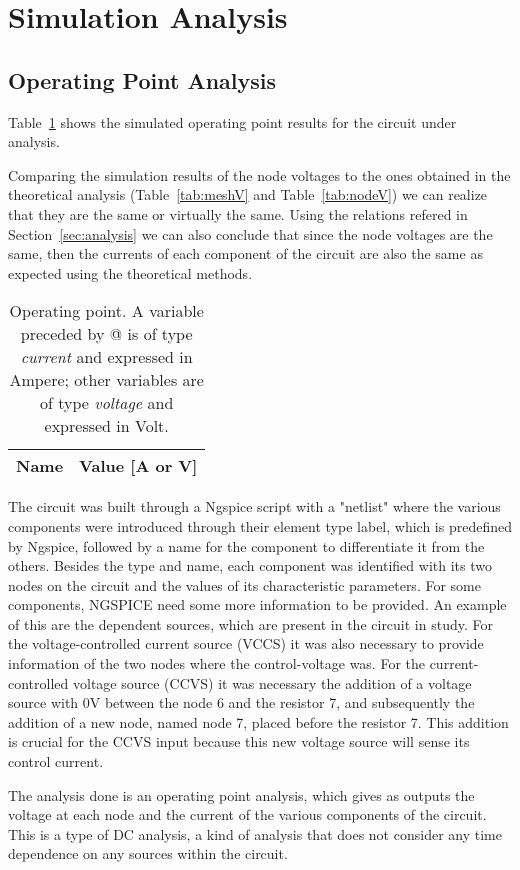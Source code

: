 \section{Simulation Analysis}
\label{sec:simulation}

\subsection{Operating Point Analysis}

Table~\ref{tab:op} shows the simulated operating point results for the circuit
under analysis. 

Comparing the simulation results of the node voltages to the ones obtained in the theoretical analysis (Table~\ref{tab:meshV} and Table~\ref{tab:nodeV}) we can realize that they are the same or virtually the same.
Using the relations refered in Section~\ref{sec:analysis} we can also conclude that since the node voltages are the same, then the currents of each component of the circuit are also the same as expected using the theoretical methods.

\begin{table}[h]
  \centering
  \begin{tabular}{|l|r|}
    \hline    
    {\bf Name} & {\bf Value [A or V]} \\ \hline
    
  \end{tabular}
  \caption{Operating point. A variable preceded by @ is of type {\em current}
    and expressed in Ampere; other variables are of type {\it voltage} and expressed in
    Volt.}
  \label{tab:op}
\end{table}

The circuit was built through a Ngspice script with a "netlist" where the various components were introduced through their element type label, which is predefined by Ngspice, followed by a name for the component to differentiate it from the others. Besides the type and name, each component was identified with its two nodes on the circuit and the values of its characteristic parameters. For some components, NGSPICE need some more information to be provided. An example of this are the dependent sources, which are present in the circuit in study. 
For the voltage-controlled current source (VCCS) it was also necessary to provide information of the two nodes where the control-voltage was. 
For the current-controlled voltage source (CCVS) it was necessary the addition of a voltage source with 0V between the node 6 and the resistor 7, and subsequently the addition of a new node, named node 7, placed before the resistor 7. This addition is crucial for the CCVS input because this new voltage source will sense its control current.

The analysis done is an operating point analysis, which gives as outputs the voltage at each node and the current of the various components of the circuit. This is a type of DC analysis, a kind of analysis that does not consider any time dependence on any sources within the circuit.


